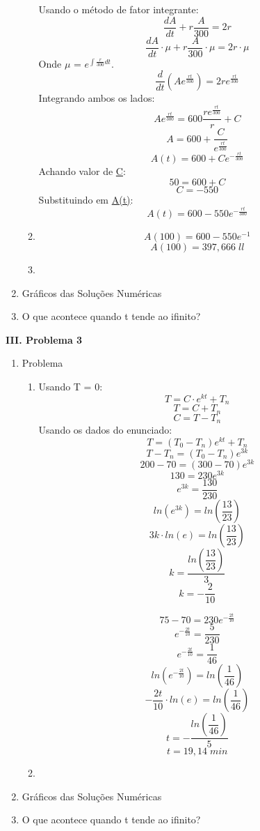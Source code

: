 \documentclass[a4paper, 12pt]{article}
\begin{document}
\begin{flushleft}
\begin{enumerate}
\begin{enumerate}
						Usando o método de fator integrante:
						$$\dfrac{dA}{dt}+ r\dfrac{A}{300} = 2r$$
						$$\dfrac{dA}{dt}\cdot\mu+ r\dfrac{A}{300}\cdot\mu = 2r\cdot\mu$$
						Onde $\mu$ = $\textit{e}^{\int \frac{r}{300}dt}$.
						$$\dfrac{d}{dt}(A\textit{e}^{\frac{rt}{300}}) = 2r\textit{e}^{\frac{rt}{300}}$$
						Integrando ambos os lados:
						$$A\textit{e}^{\frac{rt}{300}} = 600\dfrac{r\textit{e}^{\frac{rt}{300}}}{r}+C$$
						$$A = 600 + \dfrac{C}{\textit{e}^{\frac{rt}{300}}}$$
						$$A(t) = 600 + C\textit{e}^{-\frac{rt}{300}}$$
						Achando valor de \underline{C}:
						$$50 = 600 + C$$
						$$C = -550$$
						Substituindo em \underline{A(t)}:
						$$A(t) = 600 - 550\textit{e}^{-\frac{rt}{300}}$$
					\item
						$$A(100) = 600 - 550\textit{e}^{-1}$$
						$$A(100) = 397,666\;ll$$
					\item
				\end{enumerate}
			\item
				Gráficos das Soluções Numéricas
			\item
				O que acontece quando t tende ao ifinito?
		\end{enumerate}
		\textbf{III. Problema 3}
		\begin{enumerate}
			\item
				Problema
				\begin{enumerate}
					\item
						Usando T = 0:
						$$T = C\cdot\textit{e}^{kt} + T_n$$
						$$T = C + T_n$$
						$$C = T - T_n$$
						Usando os dados do enunciado:
						$$T = (T_0 - T_n)\textit{e}^{kt} + T_n$$
						$$T - T_n= (T_0 - T_n)\textit{e}^{3k}$$
						$$200 - 70 = (300 - 70)\textit{e}^{3k}$$
						$$130 = 230\textit{e}^{3k}$$
						$$\textit{e}^{3k} = \dfrac{130}{230}$$
						$$ln(\textit{e}^{3k}) = ln(\dfrac{13}{23})$$
						$$3k\cdot ln(\textit{e}) = ln(\dfrac{13}{23})$$
						$$k = \dfrac{ln(\dfrac{13}{23})}{3}$$
						$$k = -\dfrac{2}{10}$$
						
						$$75 - 70 = 230\textit{e}^{-\frac{2t}{10}}$$
						$$\textit{e}^{-\frac{2t}{10}} = \dfrac{5}{230}$$
						$$\textit{e}^{-\frac{2t}{10}} = \dfrac{1}{46}$$
						$$ln(\textit{e}^{-\frac{2t}{10}}) = ln(\dfrac{1}{46})$$
						$$-\dfrac{2t}{10}\cdot ln(\textit{e}) = ln(\dfrac{1}{46})$$
						$$t = -\dfrac{ln(\dfrac{1}{46})}{5}$$
						$$t = 19,14 \;min$$
					\item
				\end{enumerate}
			\item
				Gráficos das Soluções Numéricas
			\item
				O que acontece quando t tende ao ifinito?
		\end{enumerate}
	\end{flushleft}
\end{document}
